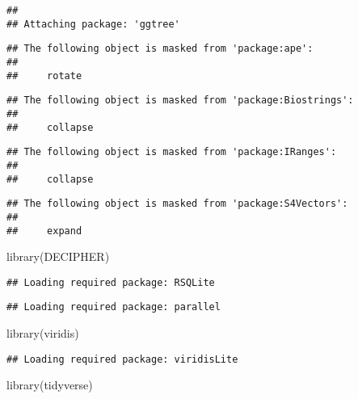 \documentclass[
]{article}
\newenvironment{Shaded}{\begin{snugshade}}{\end{snugshade}}
\newcommand{\FunctionTok}[1]{\textcolor[rgb]{0.00,0.00,0.00}{#1}}
\newcommand{\NormalTok}[1]{#1}
\begin{document}
\begin{verbatim}
## 
## Attaching package: 'ggtree'
\end{verbatim}

\begin{verbatim}
## The following object is masked from 'package:ape':
## 
##     rotate
\end{verbatim}

\begin{verbatim}
## The following object is masked from 'package:Biostrings':
## 
##     collapse
\end{verbatim}

\begin{verbatim}
## The following object is masked from 'package:IRanges':
## 
##     collapse
\end{verbatim}

\begin{verbatim}
## The following object is masked from 'package:S4Vectors':
## 
##     expand
\end{verbatim}

\begin{Shaded}
\begin{Highlighting}[]
\FunctionTok{library}\NormalTok{(DECIPHER)}
\end{Highlighting}
\end{Shaded}

\begin{verbatim}
## Loading required package: RSQLite
\end{verbatim}

\begin{verbatim}
## Loading required package: parallel
\end{verbatim}

\begin{Shaded}
\begin{Highlighting}[]
\FunctionTok{library}\NormalTok{(viridis)}
\end{Highlighting}
\end{Shaded}

\begin{verbatim}
## Loading required package: viridisLite
\end{verbatim}

\begin{Shaded}
\begin{Highlighting}[]
\FunctionTok{library}\NormalTok{(tidyverse)}
\end{Highlighting}
\end{Shaded}
\end{document}
